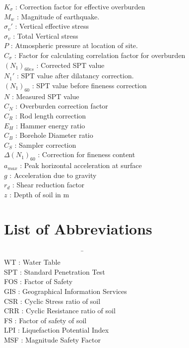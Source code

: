\begin{tabbing}
$K_\sigma$ \> : \> Correction factor for effective overburden \\
$M_w$ \> : \> Magnitude of earthquake. \\
$\sigma_v'$ \> : \> Vertical effective stress \\
$\sigma_v$ \> : \> Total Vertical stress \\
$P$ \> : \> Atmospheric pressure at location of site. \\
$C_\sigma$ \> : \> Factor for calculating correlation factor for overburden \\
$(N_1)_{60cs}$ \> : \> Corrected SPT value \\
$N_1'$ \> : \> SPT value after dilatancy correction. \\
$({N_1})_{60}$ \> : \> SPT value before fineness correction \\
$N$ \> : \> Measured SPT value \\
$C_N$ \> : \> Overburden correction factor \\
$C_R$ \> : \> Rod length correction \\
$E_H$ \> : \> Hammer energy ratio \\
$C_B$ \> : \> Borehole Diameter ratio \\
$C_S$ \> : \> Sampler correction \\
$\Delta{(N_1)}_{60}$ \> : \> Correction for fineness content \\
$a_{max}$ \> : \> Peak horizontal acceleration at surface \\
$g$ \> : \> Acceleration due to gravity \\
$r_d$ \> : \> Shear reduction factor \\
$z$ \> : \> Depth of soil in m \\
\end{tabbing}

\chapter*{List of Abbreviations}
\begin{tabbing}
~~~~~~~~~~~~~~~~~~~~~~~\= ~~~~~~~~~~~~~~~~\= \\%
WT \> : \> Water Table\\
SPT \> : \> Standard Penetration Test\\
FOS \> : \> Factor of Safety \\
GIS \> : \> Geographical Information Services\\
CSR \> : \> Cyclic Stress ratio of soil\\
CRR \> : \> Cyclic Resistance ratio of soil\\
FS \> : \> Factor of safety of soil \\
LPI \> : \> Liquefaction Potential Index\\
MSF \> : \> Magnitude Safety Factor\\

\end{tabbing}
